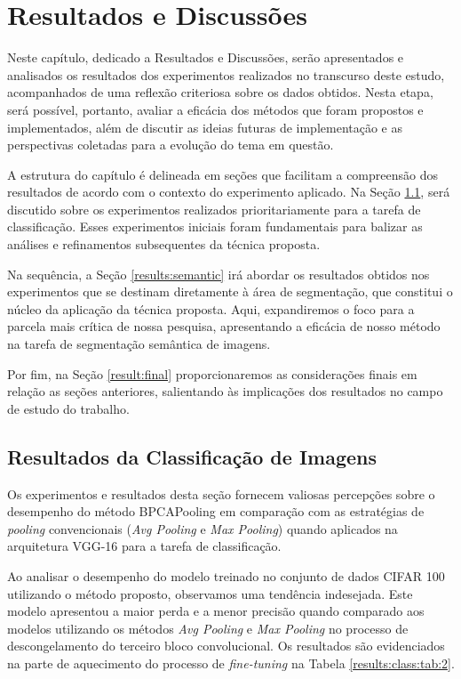 \newpage
\clearpage

\section{Resultados e Discussões}
\label{results}
Neste capítulo, dedicado a Resultados e Discussões, serão apresentados e analisados os resultados dos experimentos realizados no transcurso deste estudo, acompanhados de uma reflexão criteriosa sobre os dados obtidos. Nesta etapa, será possível, portanto, avaliar a eficácia dos métodos que foram propostos e implementados, além de discutir as ideias futuras de implementação e as perspectivas coletadas para a evolução do tema em questão.

A estrutura do capítulo é delineada em seções que facilitam a compreensão dos resultados de acordo com o contexto do experimento aplicado. Na Seção \ref{results:class}, será discutido sobre os experimentos realizados prioritariamente para a tarefa de classificação. Esses experimentos iniciais foram fundamentais para balizar as análises e refinamentos subsequentes da técnica proposta.

Na sequência, a Seção \ref{results:semantic} irá abordar os resultados obtidos nos experimentos que se destinam diretamente à área de segmentação, que constitui o núcleo da aplicação da técnica proposta. Aqui, expandiremos o foco para a parcela mais crítica de nossa pesquisa, apresentando a eficácia de nosso método na tarefa de segmentação semântica de imagens.

Por fim, na Seção \ref{result:final} proporcionaremos as considerações finais em relação as seções anteriores, salientando às implicações dos resultados no campo de estudo do trabalho.

\subsection{Resultados da Classificação de Imagens}
\label{results:class}
Os experimentos e resultados desta seção fornecem valiosas percepções sobre o desempenho do método BPCAPooling em comparação com as estratégias de \textit{pooling} convencionais (\textit{Avg Pooling} e \textit{Max Pooling}) \citep{Ozdemir2023Avg-topk:Networks} quando aplicados na arquitetura VGG-16 para a tarefa de classificação.

Ao analisar o desempenho do modelo treinado no conjunto de dados CIFAR 100 utilizando o método proposto, observamos uma tendência indesejada. Este modelo apresentou a maior perda e a menor precisão quando comparado aos modelos utilizando os métodos \textit{Avg Pooling} e \textit{Max Pooling} no processo de descongelamento do terceiro bloco convolucional. Os resultados são evidenciados na parte de aquecimento do processo de \textit{fine-tuning} na Tabela \ref{results:class:tab:2}.

